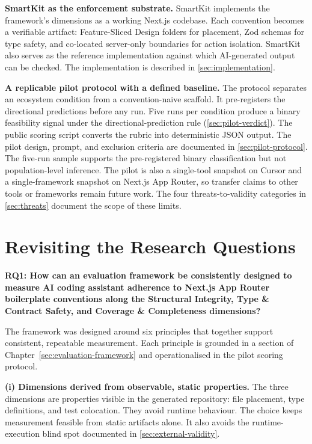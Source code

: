 \documentclass[12pt,a4paper]{report}
\begin{document}
\textbf{SmartKit as the enforcement substrate.} SmartKit implements the framework's dimensions as a working Next.js codebase. Each convention becomes a verifiable artifact: Feature-Sliced Design folders for placement, Zod schemas for type safety, and co-located server-only boundaries for action isolation. SmartKit also serves as the reference implementation against which AI-generated output can be checked. The implementation is described in \autoref{sec:implementation}.

\textbf{A replicable pilot protocol with a defined baseline.} The protocol separates an ecosystem condition from a convention-naive scaffold. It pre-registers the directional predictions before any run. Five runs per condition produce a binary feasibility signal under the directional-prediction rule (\autoref{sec:pilot-verdict}). The public scoring script converts the rubric into deterministic JSON output. The pilot design, prompt, and exclusion criteria are documented in \autoref{sec:pilot-protocol}. The five-run sample supports the pre-registered binary classification but not population-level inference. The pilot is also a single-tool snapshot on Cursor and a single-framework snapshot on Next.js App Router, so transfer claims to other tools or frameworks remain future work. The four threats-to-validity categories in \autoref{sec:threats} document the scope of these limits.

\section{Revisiting the Research Questions}

\textbf{RQ1: How can an evaluation framework be consistently designed to measure AI coding assistant adherence to Next.js App Router boilerplate conventions along the Structural Integrity, Type \& Contract Safety, and Coverage \& Completeness dimensions?}

The framework was designed around six principles that together support consistent, repeatable measurement. Each principle is grounded in a section of Chapter~\ref{sec:evaluation-framework} and operationalised in the pilot scoring protocol.

\textbf{(i) Dimensions derived from observable, static properties.} The three dimensions are properties visible in the generated repository: file placement, type definitions, and test colocation. They avoid runtime behaviour. The choice keeps measurement feasible from static artifacts alone. It also avoids the runtime-execution blind spot documented in \autoref{sec:external-validity}.
\end{document}
